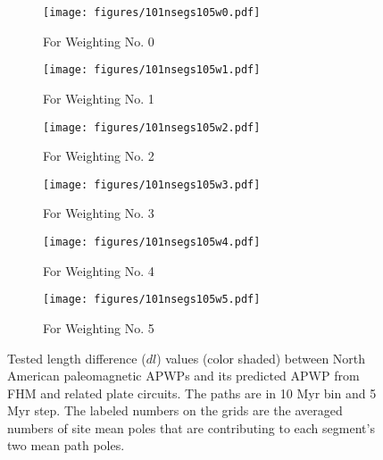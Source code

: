 \begin{figure*}
	\centering
	\begin{subfigure}{.495\textwidth}
		\texttt{[image: figures/101nsegs105w0.pdf]}
		\caption{For Weighting No. 0}\label{fig-na-dlw0}
	\end{subfigure}
	\vspace{.1em}
	\begin{subfigure}{.495\textwidth}
		\texttt{[image: figures/101nsegs105w1.pdf]}
		\caption{For Weighting No. 1}\label{fig-na-dlw1}
	\end{subfigure}
	\vspace{.1em}
	\begin{subfigure}{.495\textwidth}
		\texttt{[image: figures/101nsegs105w2.pdf]}
		\caption{For Weighting No. 2}\label{fig-na-dlw2}
	\end{subfigure}
	\vspace{.1em}
	\begin{subfigure}{.495\textwidth}
		\texttt{[image: figures/101nsegs105w3.pdf]}
		\caption{For Weighting No. 3}\label{fig-na-dlw3}
	\end{subfigure}
	\vspace{.1em}
	\begin{subfigure}{.495\textwidth}
		\texttt{[image: figures/101nsegs105w4.pdf]}
		\caption{For Weighting No. 4}\label{fig-na-dlw4}
	\end{subfigure}
	\vspace{.1em}
	\begin{subfigure}{.495\textwidth}
		\texttt{[image: figures/101nsegs105w5.pdf]}
		\caption{For Weighting No. 5}\label{fig-na-dlw5}
	\end{subfigure}
	\caption[dl of each pair of segments for North American 10/5 Myr
APWPs]{Tested length difference ($dl$) values (color shaded) between North
American paleomagnetic APWPs and its predicted APWP from FHM and related plate
circuits. The paths are in 10 Myr bin and 5 Myr step. The labeled numbers on the
grids are the averaged numbers of site mean poles that are contributing to each
segment's two mean path poles.}\label{fig-nadl}
\end{figure*}

